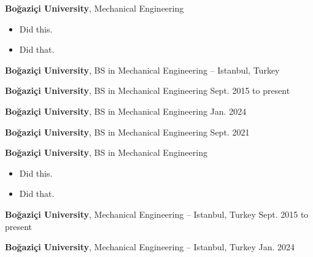 \documentclass[10pt, letterpaper]{article}
\newenvironment{highlights}{
        \begin{itemize}[
                topsep=0pt,
                partopsep=0pt,
                itemsep=0pt,
                leftmargin=10pt
            ]
    }{
        \end{itemize}
    } %
\begin{document}
        \vspace{8pt}

        \textbf{Boğaziçi University}, Mechanical Engineering \hfill 

        \begin{highlights}
        \item Did this.
        \item Did that.
        \end{highlights}


        \vspace{8pt}

        \textbf{Boğaziçi University}, BS in Mechanical Engineering -- Istanbul, Turkey \hfill 



        \vspace{8pt}

        \textbf{Boğaziçi University}, BS in Mechanical Engineering \hfill Sept. 2015 to present



        \vspace{8pt}

        \textbf{Boğaziçi University}, BS in Mechanical Engineering \hfill Jan. 2024



        \vspace{8pt}

        \textbf{Boğaziçi University}, BS in Mechanical Engineering \hfill Sept. 2021



        \vspace{8pt}

        \textbf{Boğaziçi University}, BS in Mechanical Engineering \hfill 

        \begin{highlights}
        \item Did this.
        \item Did that.
        \end{highlights}


        \vspace{8pt}

        \textbf{Boğaziçi University}, Mechanical Engineering -- Istanbul, Turkey \hfill Sept. 2015 to present



        \vspace{8pt}

        \textbf{Boğaziçi University}, Mechanical Engineering -- Istanbul, Turkey \hfill Jan. 2024
\end{document}
